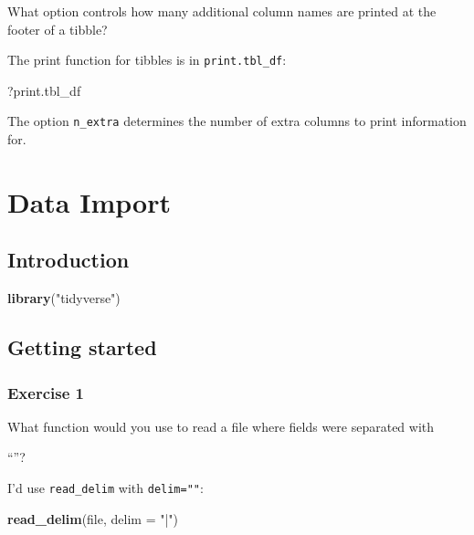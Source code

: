 \documentclass[]{book}
\newenvironment{Shaded}{\begin{snugshade}}{\end{snugshade}}
\newcommand{\DataTypeTok}[1]{\textcolor[rgb]{0.13,0.29,0.53}{#1}}
\newcommand{\KeywordTok}[1]{\textcolor[rgb]{0.13,0.29,0.53}{\textbf{#1}}}
\newcommand{\NormalTok}[1]{#1}
\newcommand{\StringTok}[1]{\textcolor[rgb]{0.31,0.60,0.02}{#1}}
\theoremstyle{definition}
\theoremstyle{definition}
\theoremstyle{definition}
\theoremstyle{remark}
\begin{document}
What option controls how many additional column names are printed at the
footer of a tibble?

The print function for tibbles is in \texttt{print.tbl\_df}:

\begin{Shaded}
\begin{Highlighting}[]
\NormalTok{?print.tbl_df}
\end{Highlighting}
\end{Shaded}

The option \texttt{n\_extra} determines the number of extra columns to
print information for.

\hypertarget{data-import}{%
\chapter{Data Import}\label{data-import}}

\hypertarget{introduction-5}{%
\section{Introduction}\label{introduction-5}}

\begin{Shaded}
\begin{Highlighting}[]
\KeywordTok{library}\NormalTok{(}\StringTok{"tidyverse"}\NormalTok{)}
\end{Highlighting}
\end{Shaded}

\hypertarget{getting-started}{%
\section{Getting started}\label{getting-started}}

\hypertarget{exercise-1-14}{%
\subsection{Exercise 1}\label{exercise-1-14}}

What function would you use to read a file where fields were separated
with

``\textbar{}''?

I'd use \texttt{read\_delim} with \texttt{delim="\textbar{}"}:

\begin{Shaded}
\begin{Highlighting}[]
\KeywordTok{read_delim}\NormalTok{(file, }\DataTypeTok{delim =} \StringTok{"|"}\NormalTok{)}
\end{Highlighting}
\end{Shaded}
\end{document}

